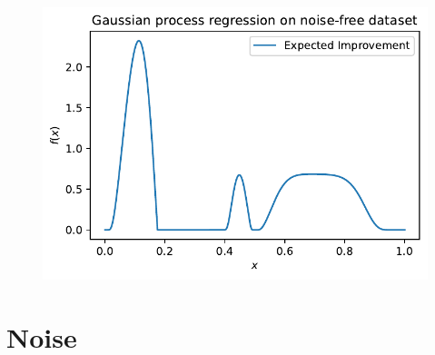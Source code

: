 \documentclass[
  letterpaper,
  DIV=11,
  numbers=noendperiod]{scrreprt}
\begin{document}
\begin{figure}[H]

{\centering \includegraphics{07_spot_ei_files/figure-pdf/cell-49-output-1.pdf}

}

\end{figure}

\hypertarget{noise}{%
\section{Noise}\label{noise}}
\end{document}
